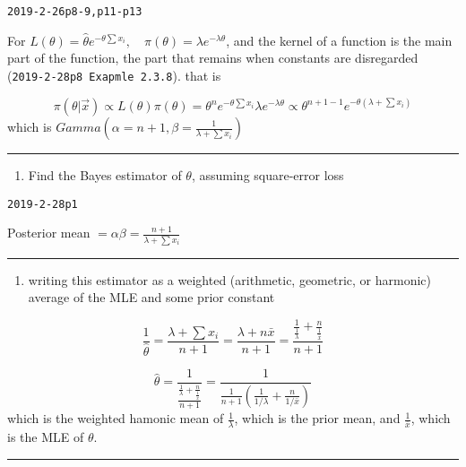 \documentclass[12pt,]{article}
\providecommand{\tightlist}{%
  \setlength{\itemsep}{0pt}\setlength{\parskip}{0pt}}
\begin{document}
\texttt{2019-2-26p8-9,p11-p13}

For
\(L(\theta)=\hat\theta e^{-\theta\sum x_i},\quad \pi(\theta)=\lambda e^{-\lambda\theta}\),
and the kernel of a function is the main part of the function, the part
that remains when constants are disregarded
(\texttt{2019-2-28p8\ Exapmle\ 2.3.8}). that is

\[\pi(\theta|\vec x)\propto L(\theta)\pi(\theta)=\theta^n e^{-\theta\sum x_i}\lambda e^{-\lambda\theta}\propto\theta^{n+1-1}e^{-\theta(\lambda+\sum x_i)}\]
which is \(Gamma(\alpha=n+1,\beta=\frac1{\lambda+\sum x_i})\)

\begin{center}\rule{0.5\linewidth}{\linethickness}\end{center}

\begin{enumerate}
\def\labelenumi{\alph{enumi}.}
\setcounter{enumi}{1}
\tightlist
\item
  \textcolor[rgb]{0.5,0.5,0.5}{Find the Bayes estimator of $\theta$, assuming square-error loss}
\end{enumerate}

\texttt{2019-2-28p1}

Posterior mean \(=\alpha\beta=\frac{n+1}{\lambda+\sum x_i}\)

\begin{center}\rule{0.5\linewidth}{\linethickness}\end{center}

\begin{enumerate}
\def\labelenumi{\alph{enumi}.}
\setcounter{enumi}{2}
\tightlist
\item
  \textcolor[rgb]{0.5,0.5,0.5}{writing this estimator as a weighted (arithmetic, geometric, or harmonic) average of the MLE and some prior constant}
\end{enumerate}

\[\frac1{\hat\theta}=\frac{\lambda+\sum x_i}{n+1}=\frac{\lambda+n\bar x}{n+1}=\frac{\frac1{\frac1\lambda}+\frac{n}{\frac1{\bar x}}}{n+1}\]

\[\hat\theta=\frac1{\frac{\frac1\lambda+\frac{n}{\frac1{\bar x}}}{n+1}}=\frac1{\frac1{n+1}(\frac1{1/\lambda}+\frac{n}{1/\bar x})}\]
which is the weighted hamonic mean of \(\frac1{\lambda}\), which is the
prior mean, and \(\frac1{\bar x}\), which is the MLE of \(\theta\).

\begin{center}\rule{0.5\linewidth}{\linethickness}\end{center}
\end{document}
